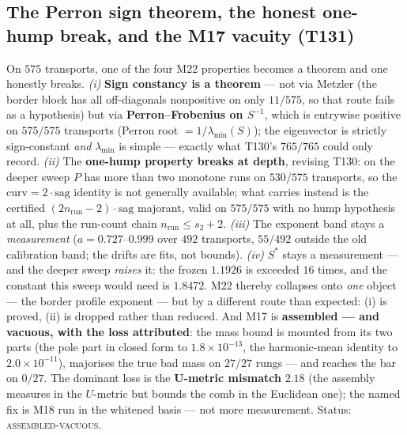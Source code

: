 \documentclass[11pt,a4paper]{article}
\begin{document}
\subsection{The Perron sign theorem, the honest one-hump break, and the M17 vacuity (T131)}
On $575$ transports, one of the four M22 properties becomes a theorem and one honestly
breaks. \emph{(i)} \textbf{Sign constancy is a theorem} --- not via Metzler (the border
block has all off-diagonals nonpositive on only $11/575$, so that route fails as a
hypothesis) but via \textbf{Perron--Frobenius on $S^{-1}$}, which is entrywise positive on
$575/575$ transports (Perron root $=1/\lambda_{\min}(S)$); the eigenvector is strictly
sign-constant \emph{and} $\lambda_{\min}$ is simple --- exactly what T130's $765/765$ could
only record. \emph{(ii)} The \textbf{one-hump property breaks at depth}, revising T130: on
the deeper sweep $P$ has more than two monotone runs on $530/575$ transports, so the
$\mathrm{curv}=2\cdot\mathrm{sag}$ identity is not generally available; what carries
instead is the certified $(2n_{\mathrm{run}}-2)\cdot\mathrm{sag}$ majorant, valid on
$575/575$ with no hump hypothesis at all, plus the run-count chain
$n_{\mathrm{run}}\le s_{2}+2$. \emph{(iii)} The exponent band stays a \emph{measurement}
($a=0.727$--$0.999$ over $492$ transports, $55/492$ outside the old calibration band; the
drifts are fits, not bounds). \emph{(iv)} $S^{*}$ stays a measurement --- and the deeper
sweep \emph{raises} it: the frozen $1.1926$ is exceeded $16$ times, and the constant this
sweep would need is $\mathbf{1.8472}$. M22 thereby collapses onto \emph{one} object --- the
border profile exponent --- but by a different route than expected: (i) is proved, (ii) is
dropped rather than reduced. And M17 is \textbf{assembled --- and vacuous, with the loss
attributed}: the mass bound is mounted from its two parts (the pole part in closed form to
$1.8\times10^{-13}$, the harmonic-mean identity to $2.0\times10^{-11}$), majorises the true
bad mass on $27/27$ rungs --- and reaches the bar on $0/27$. The dominant loss is the
\textbf{U-metric mismatch} $2.18$ (the assembly measures in the $U$-metric but bounds the
comb in the Euclidean one); the named fix is M18 run in the whitened basis --- not more
measurement. Status: \textsc{assembled-vacuous}.
\end{document}
